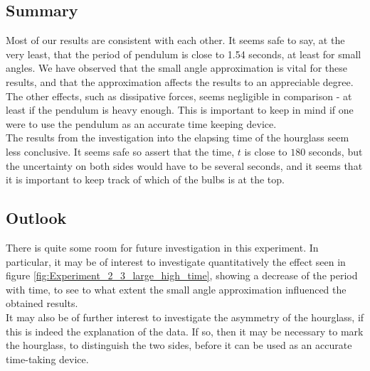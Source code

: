 \documentclass[a4paper, 10pt]{article}
\begin{document}
\subsection{Summary}
Most of our results are consistent with each other. It seems safe to say, at the very least, that the period of pendulum is close to 1.54 seconds, at least for small angles. We have observed that the small angle approximation is vital for these results, and that the approximation affects the results to an appreciable degree. The other effects, such as dissipative forces, seems negligible in comparison - at least if the pendulum is heavy enough. This is important to keep in mind if one were to use the pendulum as an accurate time keeping device.\\
\linebreak
The results from the investigation into the elapsing time of the hourglass seem less conclusive. It seems safe so assert that the time, $t$ is close to $180$ seconds, but the uncertainty on both sides would have to be several seconds, and it seems that it is important to keep track of which of the bulbs is at the top.
\subsection{Outlook}
There is quite some room for future investigation in this experiment. In particular, it may be of interest to investigate quantitatively the effect seen in figure \ref{fig:Experiment_2_3_large_high_time}, showing a decrease of the period with time, to see to what extent the small angle approximation influenced the obtained results.\\
\linebreak
It may also be of further interest to investigate the asymmetry of the hourglass, if this is indeed the explanation of the data. If so, then it may be necessary to mark the hourglass, to distinguish the two sides, before it can be used as an accurate time-taking device.
\pagebreak
\end{document}
